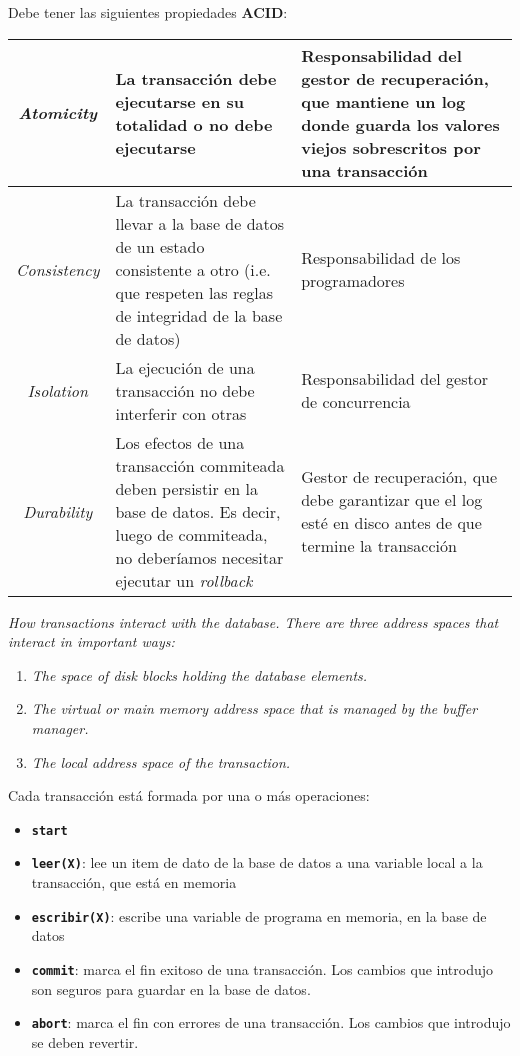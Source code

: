\documentclass[a4paper, twoside]{article}
\begin{document}
Debe tener las siguientes propiedades \textbf{ACID}:

\begin{tabular}{|c|>{\centering}m{7cm}|>{\centering}m{5cm}|}
	\hline 
	\emph{Atomicity} & La transacción debe ejecutarse en su totalidad o no debe ejecutarse & Responsabilidad del gestor de recuperación, que mantiene un log donde guarda los valores viejos sobrescritos por una transacción \tabularnewline
	\hline 
	\emph{Consistency} & La transacción debe llevar a la base de datos de un estado consistente a otro (i.e. que respeten las reglas de integridad de la base de datos) & Responsabilidad de los programadores \tabularnewline
	\hline
	\emph{Isolation} & La ejecución de una transacción no debe interferir con otras & Responsabilidad del gestor de concurrencia \tabularnewline
	\hline 
	\emph{Durability} & Los efectos de una transacción commiteada deben persistir en la base de datos. Es decir, luego de commiteada, no deberíamos necesitar ejecutar un \emph{rollback} & Gestor de recuperación, que debe garantizar que el log esté en disco antes de que termine la transacción \tabularnewline
	\hline 
\end{tabular}

\emph{How transactions interact with the database. There are three address spaces that interact in important ways:}
\begin{enumerate}
	\item \emph{The space of disk blocks holding the database elements.}
	\item \emph{The virtual or main memory address space that is managed by the buffer manager.}
	\item \emph{The local address space of the transaction.}
\end{enumerate}

Cada transacción está formada por una o más operaciones:
\begin{itemize}
	\item \texttt{\textbf{start}}
	\item \texttt{\textbf{leer(X)}}: lee un item de dato de la base de datos a una variable local a la transacción, que está en memoria
	\item \texttt{\textbf{escribir(X)}}: escribe una variable de programa en memoria, en la base de datos
	\item \texttt{\textbf{commit}}: marca el fin exitoso de una transacción. Los cambios que introdujo son seguros para guardar en la base de datos.
	\item \texttt{\textbf{abort}}: marca el fin con errores de una transacción. Los cambios que introdujo se deben revertir.
\end{itemize}
\end{document}
